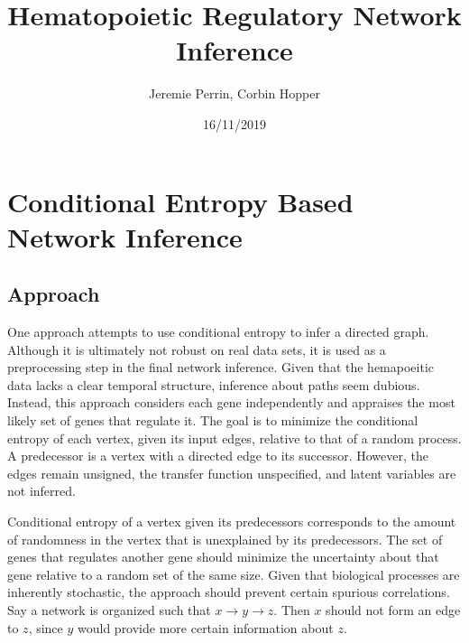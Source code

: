 \documentclass[11pt]{amsart}
\begin{document}
\title{Hematopoietic Regulatory Network Inference}

\author{Jeremie Perrin, Corbin Hopper}

\date{16/11/2019}

\maketitle

\section{Conditional Entropy Based Network Inference}

\subsection{Approach}

One approach attempts to use conditional entropy to infer a directed graph. Although it is ultimately not robust on real data sets, it is used as a preprocessing step in the final network inference. Given that the hemapoeitic data lacks a clear temporal structure, inference about paths seem dubious. Instead, this approach considers each gene independently and appraises the most likely set of genes that regulate it. The goal is to minimize the conditional entropy of each vertex, given its input edges, relative to that of a random process. A predecessor is a vertex with a directed edge to its successor. However, the edges remain unsigned, the transfer function unspecified, and latent variables are not inferred.

Conditional entropy of a vertex given its predecessors corresponds to the amount of randomness in the vertex that is unexplained by its predecessors. The set of genes that regulates another gene should minimize the uncertainty about that gene relative to a random set of the same size. Given that biological processes are inherently stochastic, the approach should prevent certain spurious correlations. Say a network is organized such that $x \rightarrow y \rightarrow z$. Then $x$ should not form an edge to $z$, since $y$ would provide more certain information about $z$.
\end{document}
